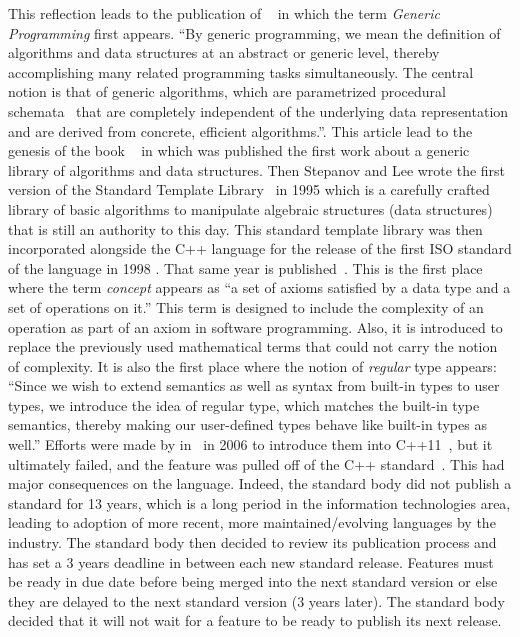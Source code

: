 This reflection leads to the publication of ~\parencite{musser.1988.generic} in which the
term \emph{Generic Programming} first appears. ``By generic programming, we mean the definition of algorithms and data
structures at an abstract or generic level, thereby accomplishing many related programming tasks simultaneously. The
central notion is that of generic algorithms, which are parametrized procedural
schemata~\parencite{goguen.1984.parametrized} that are completely independent of the underlying data representation and
are derived from concrete, efficient algorithms.''. This article lead to the genesis of the book
~\parencite{musser.1989.ada} in which was published the first work about a generic library of
algorithms and data structures. Then Stepanov and Lee wrote the first version of the Standard Template
Library~\parencite{stepanov.1995.standard} in 1995 which is a carefully crafted library of basic algorithms to
manipulate algebraic structures (data structures) that is still an authority to this day. This standard template library
was then incorporated alongside the C++ language for the release of the first ISO standard of the language in 1998
\parencite{iso.1998.cpp}. That same year is published~\parencite{dehnert.1998.fundamentals}. This is the first place
where the term \emph{concept} appears as ``a set of axioms satisfied by a data type and a set of operations on it.''
This term is designed to include the complexity of an operation as part of an axiom in software programming. Also, it is
introduced to replace the previously used mathematical terms that could not carry the notion of complexity. It is also
the first place where the notion of \emph{regular} type appears: ``Since we wish to extend semantics as well as syntax
from built-in types to user types, we introduce the idea of regular type, which matches the built-in type semantics,
thereby making our user-defined types behave like built-in types as well.'' Efforts were made by
\citeauthor{gregor.2006.concepts-art} in~\parencite{gregor.2006.concepts-proc,gregor.2006.concepts-art} in 2006 to
introduce them into C++11~\parencite{iso.2011.cpp}, but it ultimately failed, and the feature was pulled off of the C++
standard~\parencite{seymour.2009.concepts}. This had major consequences on the language. Indeed, the standard body did
not publish a standard for 13 years, which is a long period in the information technologies area, leading to adoption of
more recent, more maintained/evolving languages by the industry. The standard body then decided to review its
publication process and has set a 3 years deadline in between each new standard release. Features must be ready in due
date before being merged into the next standard version or else they are delayed to the next standard version (3 years
later). The standard body decided that it will not wait for a feature to be ready to publish its next release.

